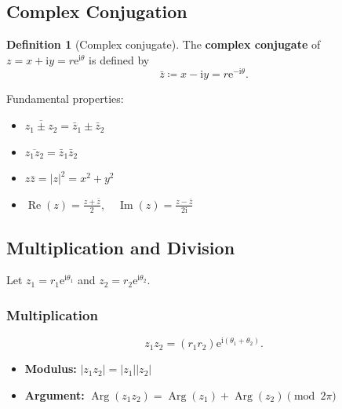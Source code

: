 \documentclass[11pt,a4paper]{article}
\theoremstyle{definition}
\newtheorem{definition}{Definition}
\theoremstyle{plain}
\begin{document}
\subsection{Complex Conjugation}



\begin{definition}[Complex conjugate]
The \textbf{complex conjugate} of $z = x + \mathrm{i} y = r \mathrm{e}^{\mathrm{i}\theta}$ is defined by
\begin{equation}
\bar{z} \coloneqq x - \mathrm{i} y = r \mathrm{e}^{-\mathrm{i}\theta}.
\end{equation}
\end{definition}

Fundamental properties:
\begin{itemize}
    \item $\overline{z_1 \pm z_2} = \bar{z}_1 \pm \bar{z}_2$
    \item $\overline{z_1 z_2} = \bar{z}_1 \bar{z}_2$
    \item $z \bar{z} = |z|^2 = x^2 + y^2$
    \item $\operatorname{Re}(z) = \frac{z + \bar{z}}{2}, \quad \operatorname{Im}(z) = \frac{z - \bar{z}}{2\mathrm{i}}$
\end{itemize}

\subsection{Multiplication and Division}



Let $z_1 = r_1 \mathrm{e}^{\mathrm{i}\theta_1}$ and $z_2 = r_2 \mathrm{e}^{\mathrm{i}\theta_2}$.

\subsubsection{Multiplication}



\begin{equation}
z_1 z_2 = (r_1 r_2) \mathrm{e}^{\mathrm{i}(\theta_1 + \theta_2)}.
\end{equation}
\begin{itemize}
    \item \textbf{Modulus:} $|z_1 z_2| = |z_1| |z_2|$
    \item \textbf{Argument:} $\operatorname{Arg}(z_1 z_2) = \operatorname{Arg}(z_1) + \operatorname{Arg}(z_2) \pmod{2\pi}$
\end{itemize}
\end{document}
